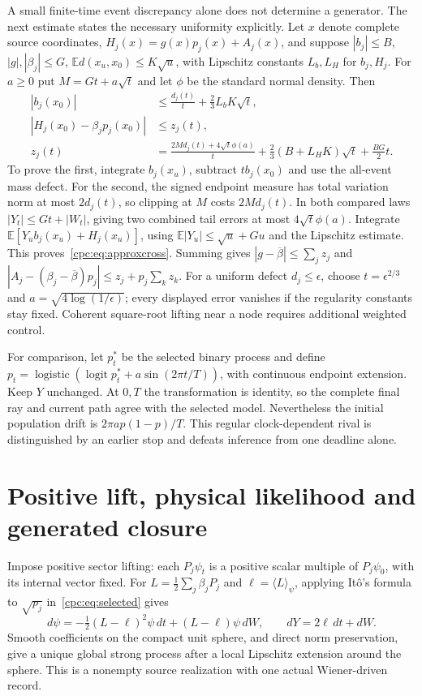 \documentclass[11pt,oneside,openany]{book}
\theoremstyle{definition}
\theoremstyle{remark}\newtheorem{remark}[theorem]{Remark}
\begin{document}
A small finite-time event discrepancy alone does not determine a generator. The next estimate states the necessary uniformity explicitly. Let $x$ denote complete source coordinates, $H_j(x)=g(x)p_j(x)+A_j(x)$, and suppose $|b_j|\le B$, $|g|,|\beta_j|\le G$, $\mathbb E d(x_u,x_0)\le K\sqrt u$, with Lipschitz constants $L_b,L_H$ for $b_j,H_j$. For $a\ge0$ put $M=Gt+a\sqrt t$ and let $\phi$ be the standard normal density. Then
\begin{align}
 |b_j(x_0)|&\le\frac{d_j(t)}t+\frac23L_bK\sqrt t,\label{cpc:eq:approxdrift}\\
 |H_j(x_0)-\beta_jp_j(x_0)|&\le z_j(t),\nonumber\\
 z_j(t)&=\frac{2Md_j(t)+4\sqrt t\phi(a)}t+
 \frac23(B+L_HK)\sqrt t+\frac{BG}2t.
 \label{cpc:eq:approxcross}
\end{align}
To prove the first, integrate $b_j(x_u)$, subtract $tb_j(x_0)$ and use the all-event mass defect. For the second, the signed endpoint measure has total variation norm at most $2d_j(t)$, so clipping at $M$ costs $2Md_j(t)$. In both compared laws $|Y_t|\le Gt+|W_t|$, giving two combined tail errors at most $4\sqrt t\phi(a)$. Integrate $\mathbb E[Y_ub_j(x_u)+H_j(x_u)]$, using $\mathbb E|Y_u|\le\sqrt u+Gu$ and the Lipschitz estimate. This proves~\eqref{cpc:eq:approxcross}. Summing gives
$|g-\overline\beta|\le\sum_jz_j$ and
$|A_j-(\beta_j-\overline\beta)p_j|\le z_j+p_j\sum_kz_k$.
For a uniform defect $d_j\le\epsilon$, choose $t=\epsilon^{2/3}$ and $a=\sqrt{4\log(1/\epsilon)}$; every displayed error vanishes if the regularity constants stay fixed. Coherent square-root lifting near a node requires additional weighted control.

For comparison, let $p_t^*$ be the selected binary process and define
$p_t=\operatorname{logistic}(\operatorname{logit}p_t^*+a\sin(2\pi t/T))$,
with continuous endpoint extension. Keep $Y$ unchanged. At $0,T$ the transformation is identity, so the complete final ray and current path agree with the selected model. Nevertheless the initial population drift is $2\pi a p(1-p)/T$. This regular clock-dependent rival is distinguished by an earlier stop and defeats inference from one deadline alone.

\section{Positive lift, physical likelihood and generated closure}

Impose positive sector lifting: each $P_j\psi_t$ is a positive scalar multiple of $P_j\psi_0$, with its internal vector fixed. For $L=\tfrac12\sum_j\beta_jP_j$ and $\ell=\langle L\rangle_\psi$, applying It\^o's formula to $\sqrt{p_j}$ in~\eqref{cpc:eq:selected} gives
\begin{equation}
 d\psi=-\tfrac12(L-\ell)^2\psi\,dt+(L-\ell)\psi\,dW,
 \qquad dY=2\ell\,dt+dW.
 \label{cpc:eq:native}
\end{equation}
Smooth coefficients on the compact unit sphere, and direct norm preservation, give a unique global strong process after a local Lipschitz extension around the sphere. This is a nonempty source realization with one actual Wiener-driven record.
\end{document}

